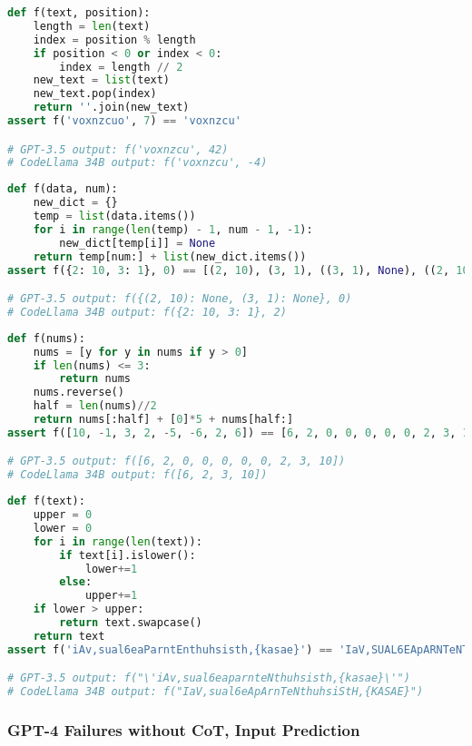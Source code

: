 \begin{lstlisting}[language=python]
def f(text, position):
    length = len(text)
    index = position % length
    if position < 0 or index < 0:
        index = length // 2
    new_text = list(text)
    new_text.pop(index)
    return ''.join(new_text)
assert f('voxnzcuo', 7) == 'voxnzcu'

# GPT-3.5 output: f('voxnzcu', 42)
# CodeLlama 34B output: f('voxnzcu', -4)
\end{lstlisting}

\begin{lstlisting}[language=python]
def f(data, num):
    new_dict = {}
    temp = list(data.items())
    for i in range(len(temp) - 1, num - 1, -1):
        new_dict[temp[i]] = None
    return temp[num:] + list(new_dict.items())
assert f({2: 10, 3: 1}, 0) == [(2, 10), (3, 1), ((3, 1), None), ((2, 10), None)]

# GPT-3.5 output: f({(2, 10): None, (3, 1): None}, 0)
# CodeLlama 34B output: f({2: 10, 3: 1}, 2)
\end{lstlisting}

\begin{lstlisting}[language=python]
def f(nums):
    nums = [y for y in nums if y > 0]
    if len(nums) <= 3:
        return nums
    nums.reverse()
    half = len(nums)//2
    return nums[:half] + [0]*5 + nums[half:]
assert f([10, -1, 3, 2, -5, -6, 2, 6]) == [6, 2, 0, 0, 0, 0, 0, 2, 3, 10]

# GPT-3.5 output: f([6, 2, 0, 0, 0, 0, 0, 2, 3, 10])
# CodeLlama 34B output: f([6, 2, 3, 10])
\end{lstlisting}

\begin{lstlisting}[language=python]
def f(text):
    upper = 0
    lower = 0
    for i in range(len(text)):
        if text[i].islower():
            lower+=1
        else:
            upper+=1
    if lower > upper:
        return text.swapcase()
    return text
assert f('iAv,sual6eaParntEnthuhsisth,{kasae}') == 'IaV,SUAL6EApARNTeNTHUHSISTH,{KASAE}'

# GPT-3.5 output: f("\'iAv,sual6eaparnteNthuhsisth,{kasae}\'")
# CodeLlama 34B output: f("IaV,sual6eApArnTeNthuhsiStH,{KASAE}")
\end{lstlisting}

\subsubsection{GPT-4 Failures without CoT, Input Prediction}

